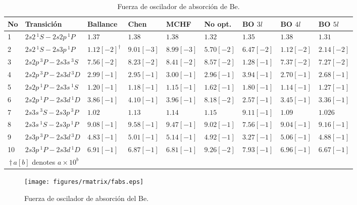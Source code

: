 \begin{table}
\begin{adjustwidth}{-.6in}{-.6in}  
\centering
\begin{tabular}{|lllllllll|} 
\hline 
No & Transición               & Ballance   & Chen       & MCHF       & No opt.    & BO $3l$    & BO $4l$  & BO $5l$ \\
\hline
\hline
1 & $2s2  \,^1S - 2s2p \,^1P$ & $1.37$ & $1.38$ & $1.38    $ & $1.32    $ & $1.35    $ & $1.38    $ & $1.31$ \\
2 & $2s2  \,^1S - 2s3p \,^1P$ & $1.12[-2]^\dagger$ & $9.01[-3]$ & $8.99[-3]$ & $5.70[-2]$ & $6.47[-2]$ & $1.12[-2]$ & $2.14[-2]$ \\
3 & $2s2p \,^3P - 2s3s \,^3S$ & $7.56[-2]$ & $8.23[-2]$ & $8.41[-2]$ & $8.57[-2]$ & $1.28[-1]$ & $7.37[-2]$ & $7.27[-2]$ \\
4 & $2s2p \,^3P - 2s3d \,^3D$ & $2.99[-1]$ & $2.95[-1]$ & $3.00[-1]$ & $2.96[-1]$ & $3.94[-1]$ & $2.70[-1]$ & $2.68[-1]$ \\
5 & $2s2p \,^1P - 2s3s \,^1S$ & $1.20[-1]$ & $1.18[-1]$ & $1.15[-1]$ & $1.62[-1]$ & $1.80[-1]$ & $1.14[-1]$ & $1.27[-1]$ \\
6 & $2s2p \,^1P - 2s3d \,^1D$ & $3.86[-1]$ & $4.10[-1]$ & $3.96[-1]$ & $8.18[-2]$ & $2.57[-1]$ & $3.45[-1]$ & $3.36[-1]$ \\
7 & $2s3s \,^3S - 2s3p \,^3P$ & $1.02$     & $1.13    $ & $1.14    $ & $1.15    $ & $9.11[-1]$ & $1.09    $ & $1.026$ \\
8 & $2s3s \,^1S - 2s3p \,^1P$ & $9.08[-1]$ & $9.58[-1]$ & $9.47[-1]$ & $9.02[-1]$ & $7.56[-1]$ & $9.04[-1]$ & $9.16[-1]$ \\
9 & $2s3p \,^3P - 2s3d \,^3D$ & $4.83[-1]$ & $5.01[-1]$ & $5.14[-1]$ & $4.92[-1]$ & $3.27[-1]$ & $5.06[-1]$ & $4.88[-1]$ \\
10 & $2s3p \,^1P - 2s3d \,^1D$ & $6.91[-1]$ & $6.87[-1]$ & $6.81[-1]$ & $9.26[-2]$ & $7.93[-1]$ & $6.96[-1]$ & $6.67[-1]$ \\
\hline
\multicolumn{2}{c}{$\dagger\,a[b]$ denotes $a\times 10^b$} \\
\end{tabular}
\caption{Fuerza de oscilador de absorción de Be.}
\label{tab:fabs}
\end{adjustwidth}
\end{table}


\begin{figure}
\centering
\texttt{[image: figures/rmatrix/fabs.eps]} 
\caption{Fuerza de oscilador de absorción del Be.}
\label{fig:fabs}
\end{figure}

